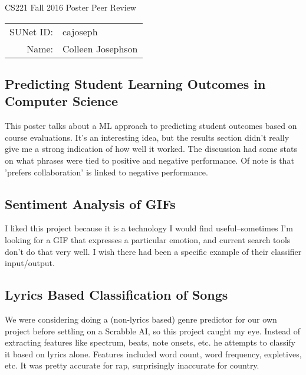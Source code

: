 \documentclass[12pt]{article}
\begin{document}
\begin{center}
{\Large CS221 Fall 2016 Poster Peer Review}

\begin{tabular}{rl}
SUNet ID: & cajoseph \\
Name: & Colleen Josephson \\
\end{tabular}
\end{center}

\subsection*{Predicting Student Learning Outcomes in Computer Science}

This poster talks about a ML approach to predicting student outcomes based on course evaluations. It's an interesting idea, but the results section didn't really give me a strong indication of how well it worked. The discussion had some stats on what phrases were tied to positive and negative performance. Of note is that 'prefers collaboration' is linked to negative performance.

\subsection*{Sentiment Analysis of GIFs}
I liked this project because it is a technology I would find useful--sometimes I'm looking for a GIF that expresses a particular emotion, and current search tools don't do that very well. I wish there had been a specific example of their classifier input/output.

\subsection*{Lyrics Based Classification of Songs}
We were considering doing a (non-lyrics based) genre predictor for our own project before settling on a Scrabble AI, so this project caught my eye. Instead of extracting features like spectrum, beats, note onsets, etc. he attempts to classify it based on lyrics alone. Features included word count, word frequency, expletives, etc. It was pretty accurate for rap, surprisingly inaccurate for country.
\end{document}
